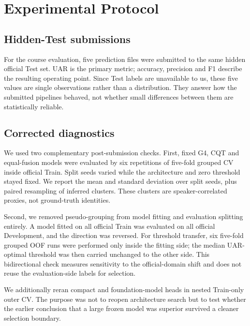 \section{Experimental Protocol}
\label{sec:protocol}

\subsection{Hidden-Test submissions}

For the course evaluation, five prediction files were submitted to the same
hidden official Test set. UAR is the primary metric; accuracy, precision and
F1 describe the resulting operating point. Since Test labels are unavailable
to us, these five values are single observations rather than a distribution.
They answer how the submitted pipelines behaved, not whether small differences
between them are statistically reliable.

\subsection{Corrected diagnostics}

We used two complementary post-submission checks. First, fixed G4, CQT and
equal-fusion models were evaluated by six repetitions of five-fold grouped CV
inside official Train. Split seeds varied while the architecture and zero
threshold stayed fixed. We report the mean and standard deviation over split
seeds, plus paired resampling of inferred clusters. These clusters are
speaker-correlated proxies, not ground-truth identities.

Second, we removed pseudo-grouping from model fitting and evaluation splitting
entirely. A model fitted on all official Train was evaluated on all official
Development, and the direction was reversed. For threshold transfer, six
five-fold grouped OOF runs were performed only inside the fitting side; the
median UAR-optimal threshold was then carried unchanged to the other side.
This bidirectional check measures sensitivity to the official-domain shift and
does not reuse the evaluation-side labels for selection.

We additionally reran compact and foundation-model heads in nested Train-only
outer CV. The purpose was not to reopen architecture search but to test whether
the earlier conclusion that a large frozen model was superior survived a
cleaner selection boundary.
